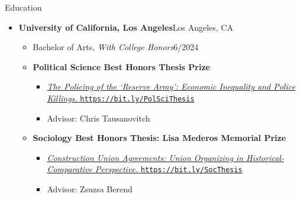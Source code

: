 \documentclass[12pt]{resume} %
\begin{document}
\thispagestyle{firstpagestyle}
\raggedright
\renewcommand{\labelitemi}{\scriptsize$\bullet$}
\begin{rSection}{Education}
\begin{itemize}[leftmargin=0em, itemsep=0pt]
\item[] \textbf{University of California, Los Angeles}\hfill{}Los Angeles, CA
\begin{itemize}[leftmargin=2em, itemsep=0pt]
    \item[] Bachelor of Arts, \textit{With College Honors}\hfill{}6/2024
    \vspace{6pt}
\item[] \textbf{Political Science Best Honors Thesis Prize}
\begin{itemize}[leftmargin=2em, itemsep=0pt, rightmargin=5em]
    \item[] \href{https://bit.ly/PolSciThesis}{\textit{The Policing of the `Reserve Army': Economic Inequality and Police Killings.} \texttt{https://bit.ly/PolSciThesis}}
    \item[] Advisor: Chris Tausanovitch
\end{itemize}
\vspace{6pt}
\item[] \textbf{Sociology Best Honors Thesis: Lisa Mederos Memorial Prize}
\begin{itemize}[leftmargin=2em, itemsep=0pt, rightmargin=5em]
    \item[] \href{https://bit.ly/SocThesis}{\textit{Construction Union Agreements: Union Organizing in Historical-Comparative Perspective.} \texttt{https://bit.ly/SocThesis}}
    \item[] Advisor: Zsuzsa Berend
    \end{itemize}

\end{itemize}
\end{itemize}
\end{rSection}
\end{document}
